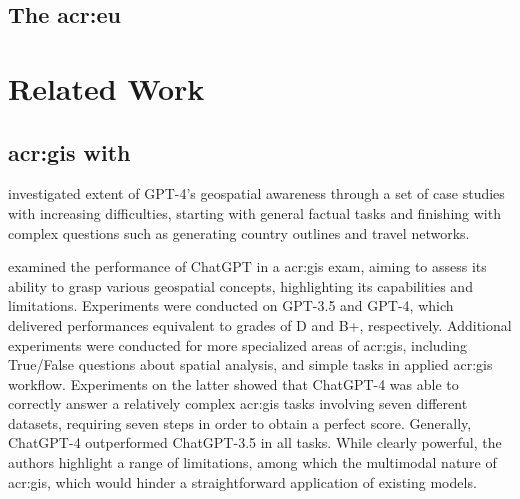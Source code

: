 \subsection[The European Union (EU)]{The \acrlong{acr:eu}}

\section{Related Work}\label{related-work}

\subsection[GIS with LLMs]{\acrshort{acr:gis} with }\label{subsec:gis-with-llms}

\cite{robertsGPT4GEOHowLanguage2023} investigated extent of GPT-4's geospatial awareness through a set of case studies with increasing difficulties, starting with general factual tasks and finishing with complex questions such as generating country outlines and travel networks.

\cite{mooneyUnderstandingGeospatialSkills2023} examined the performance of ChatGPT in a \acrfull{acr:gis} exam, aiming to assess its ability to grasp various geospatial concepts, highlighting its capabilities and limitations. Experiments were conducted on GPT-3.5 and GPT-4, which delivered performances equivalent to grades of D and B+, respectively. Additional experiments were conducted for more specialized areas of \acrshort{acr:gis}, including True/False questions about spatial analysis, and simple tasks in applied \acrshort{acr:gis} workflow. Experiments on the latter showed that ChatGPT-4 was able to correctly answer a relatively complex \acrshort{acr:gis} tasks involving seven different datasets, requiring seven steps in order to obtain a perfect score. Generally, ChatGPT-4 outperformed ChatGPT-3.5 in all tasks. While clearly powerful, the authors highlight a range of limitations, among which the multimodal nature of \acrshort{acr:gis}, which would hinder a straightforward application of existing models.


